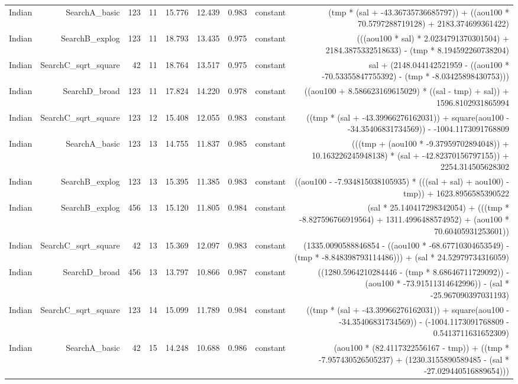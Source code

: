 \begin{table}
{\begin{tabular}{lrrrrrrrr}
Indian & SearchA\_basic & 123 & 11 & 15.776 & 12.439 & 0.983 & constant & (tmp * (sal + -43.36735736685797)) + ((aou100 * 70.5797288719128) + 2183.374699361422) \\
Indian & SearchB\_explog & 123 & 11 & 18.793 & 13.435 & 0.975 & constant & (((aou100 * sal) * 2.0234791370301504) + 2184.3875332518633) - (tmp * 8.194592260738204) \\
Indian & SearchC\_sqrt\_square & 42 & 11 & 18.764 & 13.517 & 0.975 & constant & sal + (2148.044142521959 - ((aou100 * -70.53355847755392) - (tmp * -8.03425898430753))) \\
Indian & SearchD\_broad & 123 & 11 & 17.824 & 14.220 & 0.978 & constant & ((aou100 + 8.586623169615029) * ((sal - tmp) + sal)) + 1596.8102931865994 \\
Indian & SearchC\_sqrt\_square & 123 & 12 & 15.408 & 12.055 & 0.983 & constant & ((tmp * (sal + -43.39966276162031)) + square(aou100 - -34.35406831734569)) - -1004.1173091768809 \\
Indian & SearchA\_basic & 123 & 13 & 14.755 & 11.837 & 0.985 & constant & (((tmp + (aou100 * -9.37959702894048)) + 10.163226245948138) * (sal + -42.82370156797155)) + 2254.314505628302 \\
Indian & SearchB\_explog & 123 & 13 & 15.395 & 11.385 & 0.983 & constant & ((aou100 - -7.934815038105935) * (((sal + sal) + aou100) - tmp)) + 1623.8956585390522 \\
Indian & SearchB\_explog & 456 & 13 & 15.120 & 11.805 & 0.984 & constant & (sal * 25.140417298342054) + (((tmp * -8.827596766919564) + 1311.4996488574952) + (aou100 * 70.60405931253601)) \\
Indian & SearchC\_sqrt\_square & 42 & 13 & 15.369 & 12.097 & 0.983 & constant & (1335.0090588846854 - ((aou100 * -68.67710304653549) - (tmp * -8.848398793114486))) + (sal * 24.52979734316059) \\
Indian & SearchD\_broad & 456 & 13 & 13.797 & 10.866 & 0.987 & constant & ((1280.5964210284446 - (tmp * 8.68646711729092)) - (aou100 * -73.91511314642996)) - (sal * -25.967090397031193) \\
Indian & SearchC\_sqrt\_square & 123 & 14 & 15.099 & 11.789 & 0.984 & constant & ((tmp * (sal + -43.39966276162031)) + square(aou100 - -34.35406831734569)) - (-1004.1173091768809 - 0.5413711631652309) \\
Indian & SearchA\_basic & 42 & 15 & 14.248 & 10.688 & 0.986 & constant & (aou100 * (82.4117322556167 - tmp)) + ((tmp * -7.957430526505237) + (1230.3155890589485 - (sal * -27.029440516889654))) \\

\end{tabular}}
\end{table}
